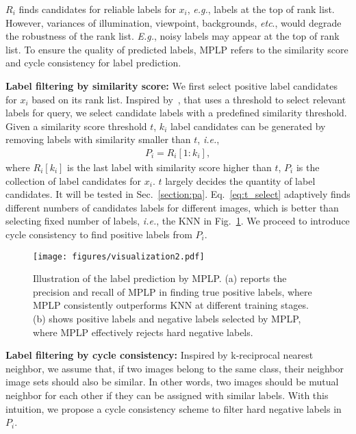 \documentclass[10pt,twocolumn,letterpaper]{article}
\begin{document}
${R}_{i}$ finds candidates for reliable labels for $x_i$, \emph{e.g.}, labels at the top of rank list. However, variances of illumination, viewpoint, backgrounds, \emph{etc}., would degrade the robustness of the rank list. \emph{E.g.}, noisy labels may appear at the top of rank list. To ensure the quality of predicted labels, MPLP refers to the similarity score and cycle consistency for label prediction.


\textbf{Label filtering by similarity score:} We first select positive label candidates for $x_i$ based on its rank list. Inspired by~\cite{zhang2013review}, that uses a threshold to select relevant labels for query, we select candidate labels with a predefined similarity threshold. Given a similarity score threshold $t$, $k_i$ label candidates can be generated by removing labels with similarity smaller than $t$, \emph{i.e.},
\begin{equation}
\begin{aligned}\label{eq:t_select}
{P}_{i} = {R}_{i}[1:k_i],
 \end{aligned}
\end{equation}
where ${R}_{i}[k_i]$ is the last label with similarity score higher than $t$, ${P}_{i}$ is the collection of label candidates for $x_i$. $t$ largely decides the quantity of label candidates. It will be tested in Sec.~\ref{section:pa}. Eq.~\eqref{eq:t_select} adaptively finds different numbers of candidates labels for different images, which is better than selecting fixed number of labels, \emph{i.e.}, the KNN in Fig.~\ref{fig:visualization}. We proceed to introduce cycle consistency to find positive labels from ${P}_{i}$.



\begin{figure}
\begin{center}
\texttt{[image: figures/visualization2.pdf]}
\end{center}
 \caption{Illustration of the label prediction by MPLP. (a) reports the precision and recall of MPLP in finding true positive labels, where MPLP consistently outperforms KNN at different training stages. (b) shows positive labels and negative labels selected by MPLP, where MPLP effectively rejects hard negative labels.}
\vspace{-1mm}
\label{fig:visualization}
\end{figure}

\textbf{Label filtering by cycle consistency:} Inspired by k-reciprocal nearest neighbor\cite{jegou2007contextual,zhong2017re}, we assume that, if two images belong to the same class, their neighbor image sets should also be similar. In other words, two images should be mutual neighbor for each other if they can be assigned with similar labels. With this intuition, we propose a cycle consistency scheme to filter hard negative labels in $P_i$.
\end{document}

